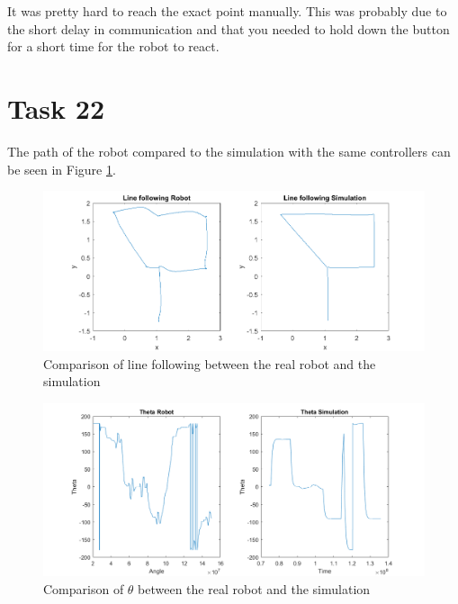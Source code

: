 \documentclass[a4paper,12pt,oneside,onecolumn]{article} %
\begin{document}
It was pretty hard to reach the exact point manually. This was probably due to the short delay in communication and that you needed to hold down the button for a short time for the robot to react.

\section*{Task 22}

The path of the robot compared to the simulation with the same controllers can be seen in Figure \ref{compare}.

\begin{figure}[H]
	\begin{center}
	\includegraphics[scale=0.5]{task22.png}
	\caption{Comparison of line following between the real robot and the simulation}
	\label{compare}
	\end{center}
\end{figure}


\begin{figure}[H]
	\begin{center}
	\includegraphics[scale=0.5]{task22angle.png}
	\caption{Comparison of  $\theta$ between the real robot and the simulation}
	\label{compareangle}
	\end{center}
\end{figure}
\end{document}
